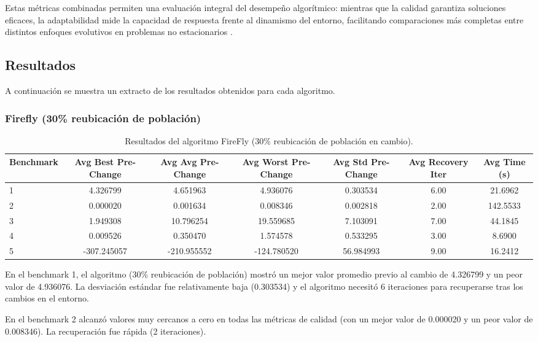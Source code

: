 \documentclass[10pt]{article}
\begin{document}
Estas métricas combinadas permiten una evaluación integral del desempeño algorítmico: mientras que la calidad garantiza soluciones eficaces, la adaptabilidad mide la capacidad de respuesta frente al dinamismo del entorno, facilitando comparaciones más completas entre distintos enfoques evolutivos en problemas no estacionarios \cite{morrison2003performance}.



\subsection*{Resultados}

A continuación se muestra un extracto de los resultados obtenidos para cada algoritmo. 

\subsubsection*{Firefly (30\% reubicación de población)}
\begin{table}[H]
\centering
\caption{Resultados del algoritmo FireFly (30\% reubicación de población en cambio).}
\label{tab:firefly}
\scriptsize
\begin{tabular}{lcccccc}
\toprule
\textbf{Benchmark} & \textbf{Avg Best Pre-Change} & \textbf{Avg Avg Pre-Change} & \textbf{Avg Worst Pre-Change} & \textbf{Avg Std Pre-Change} & \textbf{Avg Recovery Iter} & \textbf{Avg Time (s)} \\
\midrule
1 & 4.326799 & 4.651963 & 4.936076 & 0.303534 & 6.00 & 21.6962 \\
2 & 0.000020 & 0.001634 & 0.008346 & 0.002818 & 2.00 & 142.5533 \\
3 & 1.949308 & 10.796254 & 19.559685 & 7.103091 & 7.00 & 44.1845 \\
4 & 0.009526 & 0.350470 & 1.574578 & 0.533295 & 3.00 & 8.6900 \\
5 & -307.245057 & -210.955552 & -124.780520 & 56.984993 & 9.00 & 16.2412 \\
\bottomrule
\end{tabular}
\end{table}

En el benchmark 1, el algoritmo  (30\% reubicación de población) mostró un mejor valor promedio previo al cambio de 4.326799 y un peor valor de 4.936076. La desviación estándar fue relativamente baja (0.303534) y el algoritmo necesitó 6 iteraciones para recuperarse tras los cambios en el entorno.

En el benchmark 2 alcanzó valores muy cercanos a cero en todas las métricas de calidad (con un mejor valor de 0.000020 y un peor valor de 0.008346). La recuperación fue rápida (2 iteraciones).
\end{document}
